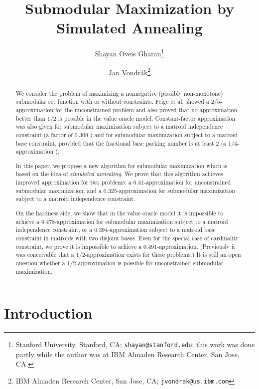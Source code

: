 \documentclass{article}[11pt]
\begin{document}
\title{Submodular Maximization by Simulated Annealing}

\author{
Shayan Oveis Gharan\thanks{Stanford University, Stanford, CA; {\tt shayan@stanford.edu};
this work was done partly while the author was at IBM Almaden Research Center, San Jose, CA.}
\and Jan Vondr\'ak\thanks{IBM Almaden Research Center, San Jose, CA; {\tt jvondrak@us.ibm.com}}
}

\maketitle

\begin{abstract}
We consider the problem of maximizing a nonnegative (possibly non-monotone)
submodular set function with or without constraints. Feige et al. \cite{FMV07}
showed a $2/5$-approximation for the unconstrained problem and also proved that
no approximation better than $1/2$ is possible in the value oracle model.
Constant-factor approximation was also given for submodular maximization subject
to a matroid independence constraint  (a factor of $0.309$ \cite{Vondrak09})
and for submodular maximization subject to a matroid base constraint,
provided that the fractional base packing number is at least $2$
(a $1/4$-approximation \cite{Vondrak09}).

In this paper, we propose a new algorithm for submodular maximization which is based
on the idea of {\em simulated annealing}. We prove that this algorithm achieves
improved approximation for two problems:
a $0.41$-approximation for unconstrained submodular maximization,
and a $0.325$-approximation for submodular maximization subject to a matroid
independence constraint.

On the hardness side, we show that in the value oracle model it is impossible
to achieve a $0.478$-approximation for submodular maximization
subject to a matroid independence constraint, or a $0.394$-approximation
subject to a matroid base constraint in matroids with two disjoint bases.
Even for the special case of cardinality constraint, we prove it is impossible to
achieve a $0.491$-approximation.
(Previously it was conceivable that a $1/2$-approximation exists for these problems.)
It is still an open question whether a $1/2$-approximation is possible
for unconstrained submodular maximization.
\end{abstract}


\thispagestyle{empty}
\newpage
\setcounter{page}{1}


\section{Introduction}
\end{document}

